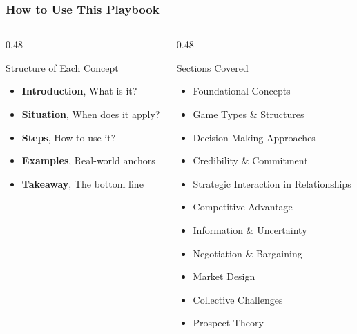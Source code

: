 \begin{frame}[fragile]\frametitle{How to Use This Playbook}
  \begin{columns}
    \begin{column}[T]{0.48\linewidth}
      \begin{block}{Structure of Each Concept}
        \begin{itemize}
          \item \textbf{Introduction}, What is it?
          \item \textbf{Situation}, When does it apply?
          \item \textbf{Steps}, How to use it?
          \item \textbf{Examples}, Real-world anchors
          \item \textbf{Takeaway}, The bottom line
        \end{itemize}
      \end{block}


    \end{column}
    \begin{column}[T]{0.48\linewidth}
      \begin{block}{Sections Covered}
        \begin{itemize}
          \item Foundational Concepts
          \item Game Types \& Structures
          \item Decision-Making Approaches
          \item Credibility \& Commitment
          \item Strategic Interaction in Relationships
          \item Competitive Advantage
          \item Information \& Uncertainty
          \item Negotiation \& Bargaining
          \item Market Design
          \item Collective Challenges
          \item Prospect Theory
        \end{itemize}
      \end{block}
    \end{column}
  \end{columns}
\end{frame}

